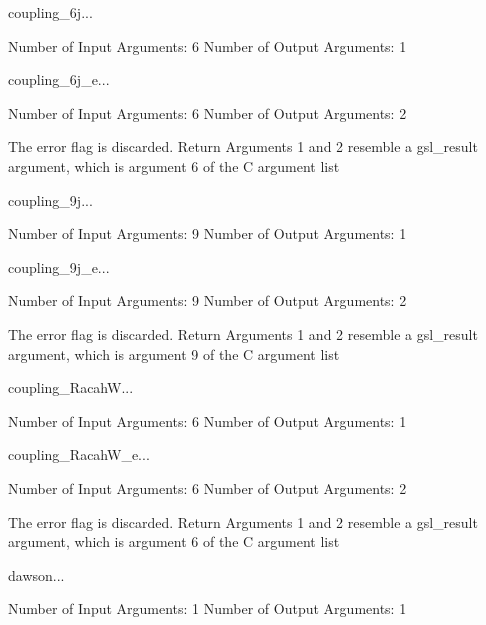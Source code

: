 \begin{funcdesc}{coupling_6j}{...}

    Number of Input  Arguments:  6
    Number of Output Arguments:  1
\end{funcdesc}

\begin{funcdesc}{coupling_6j_e}{...}

    Number of Input  Arguments:  6
    Number of Output Arguments:  2

The error flag is discarded.
Return Arguments 1 and 2 resemble a gsl_result argument,
	which is  argument 6 of the C argument list

\end{funcdesc}

\begin{funcdesc}{coupling_9j}{...}

    Number of Input  Arguments:  9
    Number of Output Arguments:  1
\end{funcdesc}

\begin{funcdesc}{coupling_9j_e}{...}

    Number of Input  Arguments:  9
    Number of Output Arguments:  2

The error flag is discarded.
Return Arguments 1 and 2 resemble a gsl_result argument,
	which is  argument 9 of the C argument list

\end{funcdesc}

\begin{funcdesc}{coupling_RacahW}{...}

    Number of Input  Arguments:  6
    Number of Output Arguments:  1
\end{funcdesc}

\begin{funcdesc}{coupling_RacahW_e}{...}

    Number of Input  Arguments:  6
    Number of Output Arguments:  2

The error flag is discarded.
Return Arguments 1 and 2 resemble a gsl_result argument,
	which is  argument 6 of the C argument list

\end{funcdesc}

\begin{funcdesc}{dawson}{...}

    Number of Input  Arguments:  1
    Number of Output Arguments:  1
\end{funcdesc}

